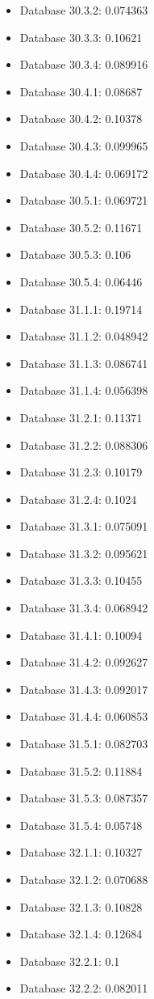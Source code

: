\begin{itemize}
\item Database 30.3.2: 0.074363
\item Database 30.3.3: 0.10621
\item Database 30.3.4: 0.089916
\item Database 30.4.1: 0.08687
\item Database 30.4.2: 0.10378
\item Database 30.4.3: 0.099965
\item Database 30.4.4: 0.069172
\item Database 30.5.1: 0.069721
\item Database 30.5.2: 0.11671
\item Database 30.5.3: 0.106
\item Database 30.5.4: 0.06446
\item Database 31.1.1: 0.19714
\item Database 31.1.2: 0.048942
\item Database 31.1.3: 0.086741
\item Database 31.1.4: 0.056398
\item Database 31.2.1: 0.11371
\item Database 31.2.2: 0.088306
\item Database 31.2.3: 0.10179
\item Database 31.2.4: 0.1024
\item Database 31.3.1: 0.075091
\item Database 31.3.2: 0.095621
\item Database 31.3.3: 0.10455
\item Database 31.3.4: 0.068942
\item Database 31.4.1: 0.10094
\item Database 31.4.2: 0.092627
\item Database 31.4.3: 0.092017
\item Database 31.4.4: 0.060853
\item Database 31.5.1: 0.082703
\item Database 31.5.2: 0.11884
\item Database 31.5.3: 0.087357
\item Database 31.5.4: 0.05748
\item Database 32.1.1: 0.10327
\item Database 32.1.2: 0.070688
\item Database 32.1.3: 0.10828
\item Database 32.1.4: 0.12684
\item Database 32.2.1: 0.1
\item Database 32.2.2: 0.082011

\end{itemize}
